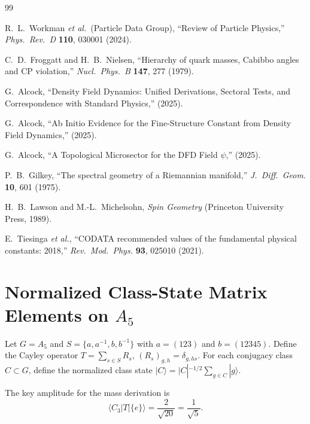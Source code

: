 \documentclass[11pt,a4paper]{article}
\theoremstyle{remark}
\begin{document}
\begin{thebibliography}{99}

 R.~L.~Workman \textit{et al.}\ (Particle Data Group),
``Review of Particle Physics,''
\textit{Phys.\ Rev.\ D} \textbf{110}, 030001 (2024).

 C.~D.~Froggatt and H.~B.~Nielsen,
``Hierarchy of quark masses, Cabibbo angles and CP violation,''
\textit{Nucl.\ Phys.\ B} \textbf{147}, 277 (1979).

 G.~Alcock,
``Density Field Dynamics: Unified Derivations, Sectoral Tests, and
Correspondence with Standard Physics,'' (2025).

 G.~Alcock,
``Ab Initio Evidence for the Fine-Structure Constant from Density Field
Dynamics,'' (2025).

 G.~Alcock,
``A Topological Microsector for the DFD Field $\psi$,'' (2025).

 P.~B.~Gilkey,
``The spectral geometry of a Riemannian manifold,''
\textit{J.\ Diff.\ Geom.} \textbf{10}, 601 (1975).

 H.~B.~Lawson and M.-L.~Michelsohn,
\textit{Spin Geometry} (Princeton University Press, 1989).

 E.~Tiesinga \textit{et al.},
``CODATA recommended values of the fundamental physical constants: 2018,''
\textit{Rev.\ Mod.\ Phys.} \textbf{93}, 025010 (2021).

\end{thebibliography}

\appendix
\section{Normalized Class-State Matrix Elements on $A_5$}
\label{app:class}

Let $G = A_5$ and $S = \{a, a^{-1}, b, b^{-1}\}$ with $a = (123)$ and
$b = (12345)$.  Define the Cayley operator
$T = \sum_{s \in S} R_s$, $(R_s)_{g,h} = \delta_{g,hs}$.
For each conjugacy class $C \subset G$, define the normalized class state
$|C\rangle = |C|^{-1/2} \sum_{g \in C} |g\rangle$.

The key amplitude for the mass derivation is
\[
\langle C_3 | T | \{e\}\rangle = \frac{2}{\sqrt{20}} = \frac{1}{\sqrt{5}}.
\]
\end{document}
